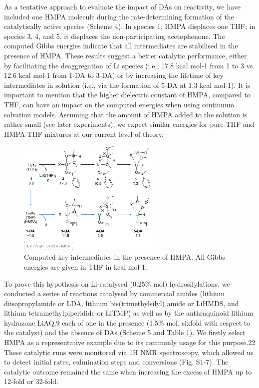 \documentclass[journal=jacsat,manuscript=article]{achemso}
\begin{document}
	As a tentative approach to evaluate the impact of DAs on	reactivity, we have included one HMPA molecule during the
	rate-determining formation of the catalytically active species (Scheme 4). In species 1, HMPA displaces one THF; in species
	3, 4, and 5, it displaces the non-participating acetophenone. The computed Gibbs energies indicate that all intermediates
	are stabilised in the presence of HMPA. These results suggest a	better catalytic performance, either by facilitating the deaggregation of Li species (i.e., 17.8 kcal mol-1 from 1 to 3 vs. 12.6 kcal mol-1 from 1-DA to 3-DA) or by increasing the lifetime of key intermediates in solution (i.e., via the formation of 5-DA at 1.3 kcal mol-1). It is important to mention that the higher dielectric constant of HMPA, compared to THF, can have an impact on the computed energies when using continuum solvation models. Assuming that the amount of HMPA added to the solution is rather small (see later experiments),
	we expect similar energies for pure THF and HMPA-THF mixtures at our current level of theory.
	
	\begin{figure}[H]
		\includegraphics[width=0.6\textwidth]{figures/CompHMPA.PNG}		
		\centering
		\caption{Computed key intermediates in the presence of HMPA. All Gibbs energies are given in THF in kcal mol-1.}
		\label{Scheme4}
	\end{figure}
	
	To prove this hypothesis on Li-catalysed (0.25\% mol) hydrosilylations, we conducted a series of reactions catalysed by
	commercial amides (lithium diisopropylamide or LDA, lithium bis(trimethylsilyl) amide or LiHMDS, and lithium tetramethylpiperidide or LiTMP) as well as by the anthraquinoid lithium	hydrazone LiAQ,9 each of one in the presence (1.5\% mol, sixfold with respect to the catalyst) and the absence of DAs (Scheme 5 and Table 1). We firstly select HMPA as a representative example due to its commonly usage for this purpose.22 These catalytic runs were monitored via 1H NMR spectroscopy, which allowed us to detect initial rates, culmination steps and conversions (Fig. S1-7). The catalytic outcome remained the same when increasing the excess of HMPA up to 12-fold or 32-fold.
	
\end{document}
